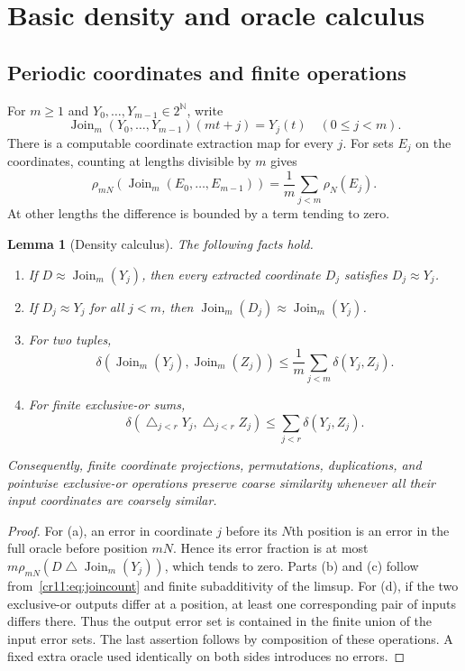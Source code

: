 \documentclass[11pt,letterpaper]{article}
\theoremstyle{plain}
\newtheorem{lemma}[theorem]{Lemma}
\theoremstyle{definition}
\theoremstyle{remark}
\numberwithin{equation}{section}
\newcommand{\N}{\mathbb N}
\newcommand{\Cantor}{2^{\N}}
\newcommand{\bitsum}{\mathbin{\triangle}}
\begin{document}
\section{Basic density and oracle calculus}\label{cr11:sec:calculus}

\subsection{Periodic coordinates and finite operations}

For $m\geq1$ and $Y_0,\ldots,Y_{m-1}\in\Cantor$, write
\[
 \operatorname{Join}_m(Y_0,\ldots,Y_{m-1})(mt+j)=Y_j(t)
 \quad(0\leq j<m).
\]
There is a computable coordinate extraction map for every $j$. For sets
$E_j$ on the coordinates, counting at lengths divisible by $m$ gives
\begin{equation}\label{cr11:eq:joincount}
 \rho_{mN}\!\left(\operatorname{Join}_m(E_0,\ldots,E_{m-1})\right)
       =\frac1m\sum_{j<m}\rho_N(E_j).
\end{equation}
At other lengths the difference is bounded by a term tending to zero.

\begin{lemma}[Density calculus]\label{cr11:lem:density}
The following facts hold.
\begin{enumerate}[label=\textup{(\alph*)}]
\item If $D\approx\operatorname{Join}_m(Y_j)$, then every extracted
coordinate $D_j$ satisfies $D_j\approx Y_j$.
\item If $D_j\approx Y_j$ for all $j<m$, then
$\operatorname{Join}_m(D_j)\approx\operatorname{Join}_m(Y_j)$.
\item For two tuples,
\[
 \delta\!\left(\operatorname{Join}_m(Y_j),\operatorname{Join}_m(Z_j)\right)
       \leq\frac1m\sum_{j<m}\delta(Y_j,Z_j).
\]
\item For finite exclusive-or sums,
\[
 \delta\!\left(\mathop{\triangle}_{j<r}Y_j,
                    \mathop{\triangle}_{j<r}Z_j\right)
       \leq\sum_{j<r}\delta(Y_j,Z_j).
\]
\end{enumerate}
Consequently, finite coordinate projections, permutations, duplications,
and pointwise exclusive-or operations preserve coarse similarity whenever
all their input coordinates are coarsely similar.
\end{lemma}
\begin{proof}
For (a), an error in coordinate $j$ before its $N$th position is an error
in the full oracle before position $mN$. Hence its error fraction is at most
$m\rho_{mN}(D\bitsum\operatorname{Join}_m(Y_j))$, which tends to zero.
Parts (b) and (c) follow from~\eqref{cr11:eq:joincount} and finite subadditivity
of the limsup. For (d), if the two exclusive-or outputs differ at a position,
at least one corresponding pair of inputs differs there. Thus the output
error set is contained in the finite union of the input error sets. The
last assertion follows by composition of these operations. A fixed extra
oracle used identically on both sides introduces no errors.
\end{proof}
\end{document}
